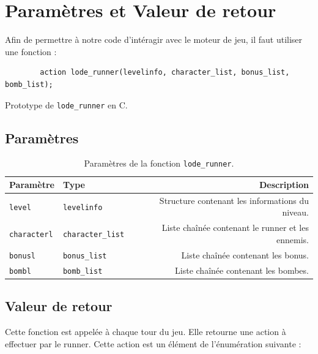 \chapter{Paramètres et Valeur de retour}
\label{chap:Parametres}

Afin de permettre à notre code d'intéragir avec le moteur de jeu, il faut utiliser une fonction :

\begin{listing}[!htpb]
    \begin{verbatim}
        action lode_runner(levelinfo, character_list, bonus_list, bomb_list);
    \end{verbatim}
    \caption{Prototype de \texttt{lode\_runner} en C.}
    \label{listing:c-lode_runner-prototype-1}
\end{listing}

\section{Paramètres}

\begin{table}[!htpb]
    \label{tab:parameters-lode_runner-1}
    \begin{tabularx}{\textwidth}{lXr}
        \toprule
        \textbf{Paramètre} & \textbf{Type} & \textbf{Description} \\
        \midrule
        \texttt{level} & \texttt{levelinfo} & Structure contenant les informations du niveau. \\
        \texttt{characterl} & \texttt{character\_list} & Liste chaînée contenant le runner et les ennemis. \\
        \texttt{bonusl} & \texttt{bonus\_list} & Liste chaînée contenant les bonus. \\
        \texttt{bombl} & \texttt{bomb\_list} & Liste chaînée contenant les bombes. \\
        \bottomrule
    \end{tabularx}
    \caption{Paramètres de la fonction \texttt{lode\_runner}.}
\end{table}

\section{Valeur de retour}

Cette fonction est appelée à chaque tour du jeu. Elle retourne une action à effectuer par le runner.
Cette action est un élément de l'énumération suivante :

